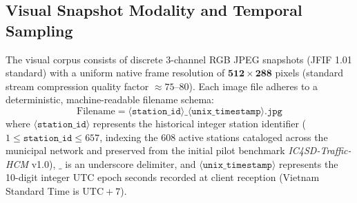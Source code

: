 \documentclass[preprint,12pt]{elsarticle}
\begin{document}
\subsection{Visual Snapshot Modality and Temporal Sampling}
The visual corpus consists of discrete 3-channel RGB JPEG snapshots (JFIF 1.01 standard) with a uniform native frame resolution of $\mathbf{512 \times 288}$ pixels (standard stream compression quality factor $\approx 75$--$80$). Each image file adheres to a deterministic, machine-readable filename schema:
\begin{equation}
    \text{Filename} = \langle\texttt{station\_id}\rangle \mathbin{\_} \langle\texttt{unix\_timestamp}\rangle\texttt{.jpg}
\end{equation}
where $\langle\texttt{station\_id}\rangle$ represents the historical integer station identifier ($1 \le \texttt{station\_id} \le 657$, indexing the 608 active stations cataloged across the municipal network and preserved from the initial pilot benchmark \textit{IC4SD-Traffic-HCM} v1.0), $\mathbin{\_}$ is an underscore delimiter, and $\langle\texttt{unix\_timestamp}\rangle$ represents the 10-digit integer UTC epoch seconds recorded at client reception (Vietnam Standard Time is $\text{UTC} + 7$). 
\end{document}
